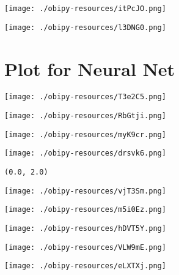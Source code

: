 \documentclass[11pt]{article}
\begin{document}
\begin{center}
\texttt{[image: ./obipy-resources/itPcJO.png]}
\end{center}



\begin{center}
\texttt{[image: ./obipy-resources/l3DNG0.png]}
\end{center}

\section{Plot for Neural Net}
\label{sec:org2b664b2}

\begin{center}
\texttt{[image: ./obipy-resources/T3e2C5.png]}
\end{center}

\begin{center}
\texttt{[image: ./obipy-resources/RbGtji.png]}
\end{center}

\begin{center}
\texttt{[image: ./obipy-resources/myK9cr.png]}
\end{center}



\begin{center}
\texttt{[image: ./obipy-resources/drsvk6.png]}
\end{center}



\begin{verbatim}
(0.0, 2.0)
\end{verbatim}
\begin{center}
\texttt{[image: ./obipy-resources/vjT3Sm.png]}
\end{center}

\begin{center}
\texttt{[image: ./obipy-resources/m5i0Ez.png]}
\end{center}


\begin{center}
\texttt{[image: ./obipy-resources/hDVT5Y.png]}
\end{center}


\begin{center}
\texttt{[image: ./obipy-resources/VLW9mE.png]}
\end{center}


\begin{center}
\texttt{[image: ./obipy-resources/eLXTXj.png]}
\end{center}
\end{document}
